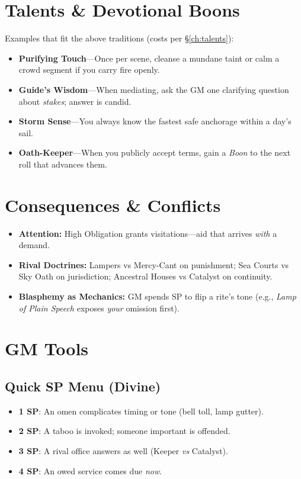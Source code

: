 \begin{multicols}{2}
\section{Talents \& Devotional Boons}
Examples that fit the above traditions (costs per \S\ref{ch:talents}):
\begin{itemize}
  \item \textbf{Purifying Touch}—Once per scene, cleanse a mundane taint or calm a crowd segment if you carry fire openly.
  \item \textbf{Guide’s Wisdom}—When mediating, ask the GM one clarifying question about \emph{stakes}; answer is candid.
  \item \textbf{Storm Sense}—You always know the fastest safe anchorage within a day’s sail.
  \item \textbf{Oath-Keeper}—When you publicly accept terms, gain a \emph{Boon} to the next roll that advances them.
\end{itemize}

\section{Consequences \& Conflicts}
\begin{itemize}
  \item \textbf{Attention:} High Obligation grants visitations—aid that arrives \emph{with} a demand.
  \item \textbf{Rival Doctrines:} Lampers vs Mercy-Cant on punishment; Sea Courts vs Sky Oath on jurisdiction; Ancestral Houses vs Catalyst on continuity.
  \item \textbf{Blasphemy as Mechanics:} GM spends SP to flip a rite’s tone (e.g., \emph{Lamp of Plain Speech} exposes \emph{your} omission first).
\end{itemize}

\section{GM Tools}
\subsection*{Quick SP Menu (Divine)}
\begin{itemize}
  \item \textbf{1 SP}: An omen complicates timing or tone (bell toll, lamp gutter).
  \item \textbf{2 SP}: A taboo is invoked; someone important is offended.
  \item \textbf{3 SP}: A rival office answers as well (Keeper \emph{vs} Catalyst).
  \item \textbf{4 SP}: An owed service comes due \emph{now}.
\end{itemize}


\end{multicols}
